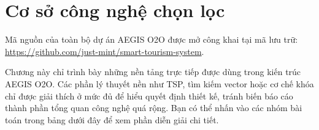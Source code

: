 \documentclass[12pt, a4paper]{article}
\begin{document}
\clearpage
\section{Cơ sở công nghệ chọn lọc}

Mã nguồn của toàn bộ dự án AEGIS O2O được mở công khai tại mã lưu trữ: \url{https://github.com/just-mint/smart-tourism-system}.

Chương này chỉ trình bày những nền tảng trực tiếp được dùng trong kiến trúc AEGIS O2O. Các phần lý thuyết nền như TSP, tìm kiếm vector hoặc cơ chế khóa chỉ được giải thích ở mức đủ để hiểu quyết định thiết kế, tránh biến báo cáo thành phần tổng quan công nghệ quá rộng. Bạn có thể nhấn vào các nhóm bài toán trong bảng dưới đây để xem phần diễn giải chi tiết.
\end{document}
